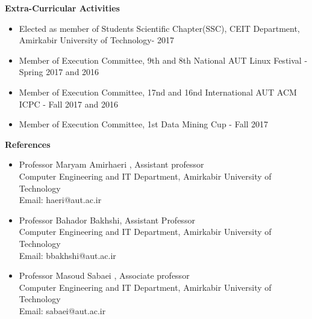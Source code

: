 \documentclass[a4paper,12pt,final]{memoir}
\newcommand{\Sep}{\vspace{1.5em}}
\newcommand{\SmallSep}{\vspace{0.5em}}
\newcommand{\CVSection}[1]
	{\Large\textbf{#1}\par
	\SmallSep\normalsize\normalfont}
\begin{document}
\Sep

\CVSection{Extra-Curricular Activities}
	\begin{itemize}
		\item Elected as member of Students Scientific Chapter(SSC), CEIT Department, Amirkabir University of Technology- 2017
		\item Member of Execution Committee, 9th and 8th National AUT Linux Festival - Spring 2017 and 2016
		\item Member of Execution Committee, 17nd and 16nd International AUT ACM ICPC - Fall 2017 and 2016
		\item Member of Execution Committee, 1st Data Mining Cup - Fall 2017
		
	\end{itemize}

\CVSection{References}
	\begin{itemize}
		\item {Professor Maryam Amirhaeri , Assistant professor\\ 
		Computer Engineering and IT Department, Amirkabir University of Technology\\
Email: haeri@aut.ac.ir }
		\item {Professor Bahador Bakhshi, Assistant Professor \\
Computer Engineering and IT Department, Amirkabir University of Technology\\
Email: bbakhshi@aut.ac.ir}

		\item {Professor Masoud Sabaei , Associate professor\\ 
		Computer Engineering and IT Department, Amirkabir University of Technology\\
Email: sabaei@aut.ac.ir } 
		
	\end{itemize}
\end{document}
